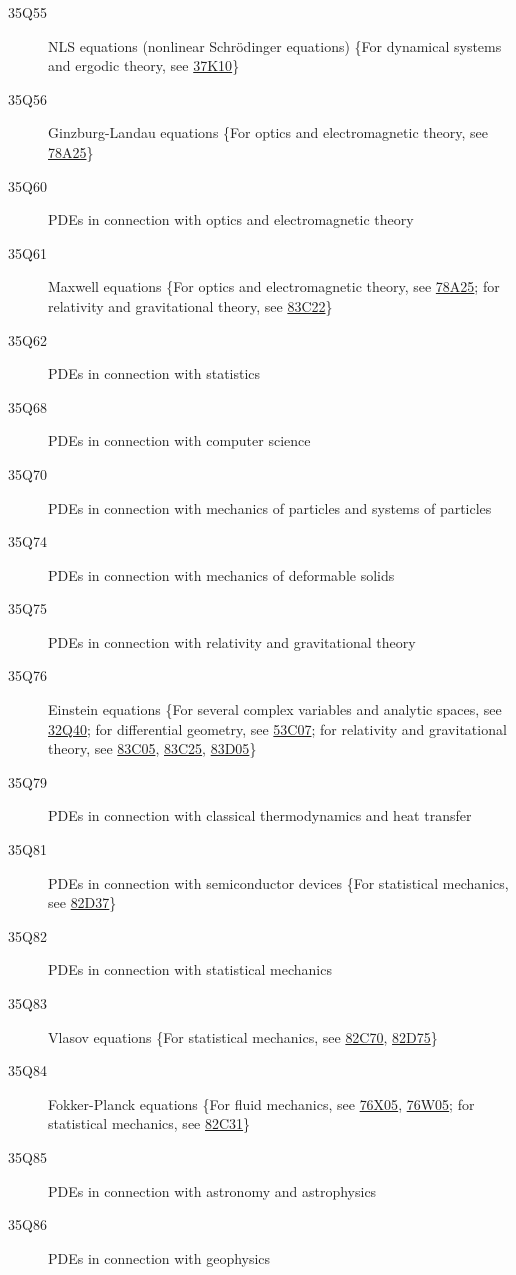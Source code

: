 \documentclass[letterpaper]{article}
\begin{document}
\begin{description}
\item [35Q55]\label{35Q55} NLS equations (nonlinear Schr\"{o}dinger equations) \{For dynamical systems and ergodic theory, see \hyperref[37K10]{37K10}\}
\item [35Q56]\label{35Q56} Ginzburg-Landau equations \{For optics and electromagnetic theory, see \hyperref[78A25]{78A25}\}
\item [35Q60]\label{35Q60} PDEs in connection with optics and electromagnetic theory
\item [35Q61]\label{35Q61} Maxwell equations  \{For optics and electromagnetic theory, see \hyperref[78A25]{78A25}; for relativity and gravitational theory, see \hyperref[83C22]{83C22}\}
\item [35Q62]\label{35Q62} PDEs in connection with statistics
\item [35Q68]\label{35Q68} PDEs in connection with computer science
\item [35Q70]\label{35Q70} PDEs in connection with mechanics of particles and systems of particles
\item [35Q74]\label{35Q74} PDEs in connection with mechanics of deformable solids
\item [35Q75]\label{35Q75} PDEs in connection with relativity and gravitational theory
\item [35Q76]\label{35Q76} Einstein equations \{For several complex variables and analytic spaces, see \hyperref[32Q40]{32Q40}; for differential geometry, see \hyperref[53C07]{53C07}; for relativity and gravitational theory, see \hyperref[83C05]{83C05}, \hyperref[83C25]{83C25}, \hyperref[83D05]{83D05}\}
\item [35Q79]\label{35Q79} PDEs in connection with classical thermodynamics and heat transfer
\item [35Q81]\label{35Q81} PDEs in connection with semiconductor devices \{For statistical mechanics, see \hyperref[82D37]{82D37}\}
\item [35Q82]\label{35Q82} PDEs in connection with statistical mechanics
\item [35Q83]\label{35Q83} Vlasov equations \{For statistical mechanics, see \hyperref[82C70]{82C70}, \hyperref[82D75]{82D75}\}
\item [35Q84]\label{35Q84} Fokker-Planck equations \{For fluid mechanics, see \hyperref[76X05]{76X05}, \hyperref[76W05]{76W05}; for statistical mechanics, see \hyperref[82C31]{82C31}\}
\item [35Q85]\label{35Q85} PDEs in connection with astronomy and astrophysics
\item [35Q86]\label{35Q86} PDEs in connection with geophysics

\end{description}
\end{document}
